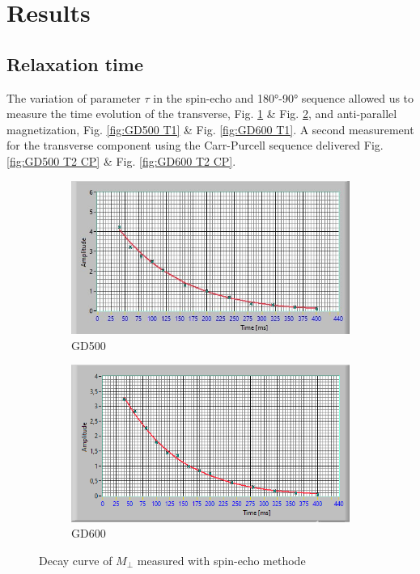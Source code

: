\section{Results}
\subsection{Relaxation time}
The variation of parameter $\tau$ in the spin-echo and 180°-90° sequence allowed us to measure the time evolution of the transverse, Fig. \ref{fig:GD500 T2 Sp} \& Fig. \ref{fig:GD600 T2 Sp}, and anti-parallel magnetization, Fig. \ref{fig:GD500 T1} \& Fig. \ref{fig:GD600 T1}. A second measurement for the transverse component using the Carr-Purcell sequence delivered Fig. \ref{fig:GD500 T2 CP} \& Fig. \ref{fig:GD600 T2 CP}. 

\begin{figure}[!htbp]
  \centering
  \begin{subfigure}[b]{0.45\textwidth}
    \centering
    \includegraphics[width=\textwidth]{./Protocol images/GD500_T2_sp_fit (1).jpg}
    \caption{GD500}
    \label{fig:GD500 T2 Sp}
  \end{subfigure}
  \hfill
  \begin{subfigure}[b]{0.45\textwidth}
    \centering
    \includegraphics[width=\textwidth]{./Protocol images/GD60_Sp (1).png}
    \caption{GD600}
    \label{fig:GD600 T2 Sp}
  \end{subfigure}
  \caption{Decay curve of $M_\perp$ measured with spin-echo methode}
  \label{fig:subsidebyside}
\end{figure}

